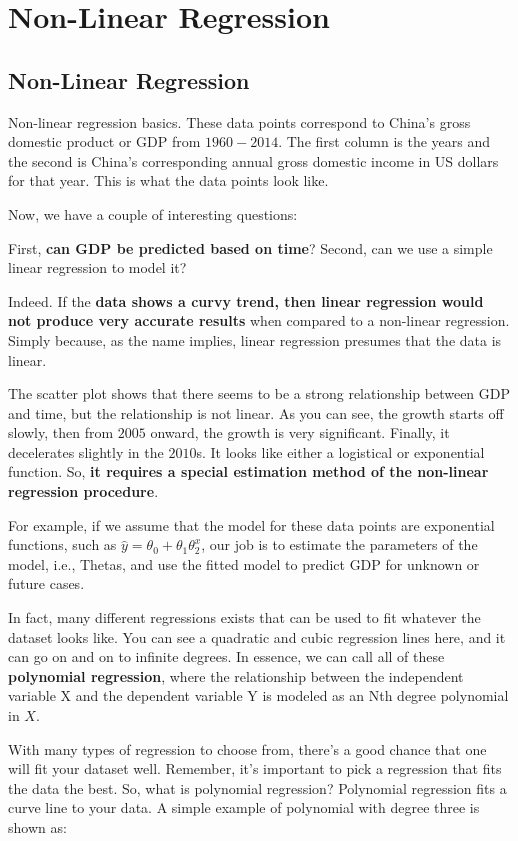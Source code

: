 \section{Non-Linear Regression}

	\subsection{Non-Linear Regression}
	
	Non-linear regression basics. These data points correspond to China's gross domestic product or GDP from $1960-2014$. The first column is the years and the second is China's corresponding annual gross domestic income in US dollars for that year. This is what the data points look like. 
	
	Now, we have a couple of interesting questions:
	
	First, \textbf{can GDP be predicted based on time}? Second, can we use a simple linear regression to model it? 
	
	Indeed. If the \textbf{data shows a curvy trend, then linear regression would not produce very accurate results} when compared to a non-linear regression. Simply because, as the name implies, linear regression presumes that the data is linear. 
	
	The scatter plot shows that there seems to be a strong relationship between GDP and time, but the relationship is not linear. As you can see, the growth starts off slowly, then from $2005$ onward, the growth is very significant. Finally, it decelerates slightly in the $2010$s. It looks like either a logistical or exponential function. So, \textbf{it requires a special estimation method of the non-linear regression procedure}. 
	
	For example, if we assume that the model for these data points are exponential functions, such as $\hat{y} = \theta_{0} + \theta_{1}\theta_{2}^{x}$, our job is to estimate the parameters of the model, i.e., Thetas, and use the fitted model to predict GDP for unknown or future cases. 
	
	In fact, many different regressions exists that can be used to fit whatever the dataset looks like. You can see a quadratic and cubic regression lines here, and it can go on and on to infinite degrees. In essence, we can call all of these \textbf{polynomial regression}, where the relationship between the independent variable X and the dependent variable Y is modeled as an Nth degree polynomial in $X$. 
	
	With many types of regression to choose from, there's a good chance that one will fit your dataset well. Remember, it's important to pick a regression that fits the data the best. So, what is polynomial regression? Polynomial regression fits a curve line to your data. A simple example of polynomial with degree three is shown as:
	
